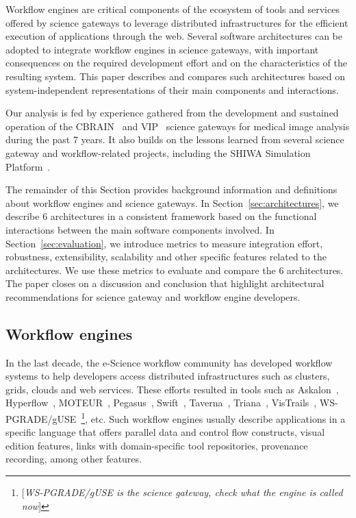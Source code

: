 \documentclass[preprint,3p,twocolumn]{elsarticle}
\newcommand{\todo}[1]{\color{blue}\xspace[\emph{#1}]\xspace\color{black}}
\begin{document}
Workflow engines are critical components of the ecosystem of tools and
services offered by science gateways to leverage distributed
infrastructures for the efficient execution of applications through
the web. Several software architectures can be adopted to integrate
workflow engines in science gateways, with important consequences on
the required development effort and on the characteristics of the
resulting system. This paper describes and compares such architectures
based on system-independent representations of their main components
and interactions.

Our analysis is fed by experience gathered from the development and
sustained operation of the CBRAIN~\cite{SHER-14} and
VIP~\cite{GLAT-13} science gateways for medical image analysis during
the past 7 years. It also builds on the lessons learned from several
science gateway and workflow-related projects, including the SHIWA
Simulation Platform~\cite{terstyanszky2014enabling}.

The remainder of this Section provides background information and
definitions about workflow engines and science gateways. In
Section~\ref{sec:architectures}, we describe 6 architectures in a
consistent framework based on the functional interactions between the
main software components involved. In Section~\ref{sec:evaluation}, we
introduce metrics to measure integration effort, robustness,
extensibility, scalability and other specific features related to the
architectures. We use these metrics to evaluate and compare the 6
architectures. The paper closes on a discussion and conclusion that
highlight architectural recommendations for science gateway and
workflow engine developers.

\subsection{Workflow engines}

In the last decade, the e-Science workflow community has developed
workflow systems to help developers access distributed infrastructures
such as clusters, grids, clouds and web services. These efforts
resulted in tools such as Askalon~\cite{fahringer2005askalon},
Hyperflow~\cite{balis2016hyperflow}, MOTEUR~\cite{GLAT-08i},
Pegasus~\cite{deelman2005pegasus,Deelman201517},
Swift~\cite{zhao2007swift}, Taverna~\cite{oinn2004taverna},
Triana~\cite{taylor2007triana}, VisTrails~\cite{callahan2006managing},
WS-PGRADE/gUSE~\cite{Kacsuk2012}\footnote{\todo{WS-PGRADE/gUSE is the
    science gateway, check what the engine is called now}}, etc. Such
workflow engines usually describe applications in a specific language
that offers parallel data and control flow constructs, visual edition
features, links with domain-specific tool repositories, provenance
recording, among other features.
\end{document}
